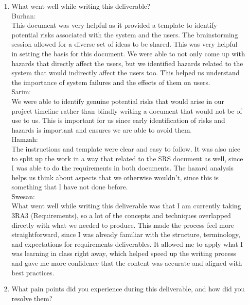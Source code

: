 \documentclass{article}
\begin{document}


\begin{enumerate}
    \item What went well while writing this deliverable? \\
    
    Burhan: \\
    This document was very helpful as it provided a template to identify potential risks associated with the system and the users. The brainstorming session allowed for a diverse set of ideas to be shared. This was very helpful in setting the basis for this document. We were able to not only come up with hazards that directly affect the users, but we identified hazards related to the system that would indirectly affect the users too. This helped us understand the importance of system failures and the effects of them on users.  \\

Sarim: \\
We were able to identify genuine potential risks that would arise in our project timeline rather than blindly writing a document that would not be of use to us. This is important for us since early identification of risks and hazards is important and ensures we are able to avoid them. 
\\

Hamzah: \\
The instructions and template were clear and easy to follow. It was also nice to split up the work in a way that related to the SRS document as well, since I was able to do the requirements in both documents. The hazard analysis helps us think about aspects that we otherwise wouldn't, since this is something that I have not done before.  
\\   

Swesan: \\
What went well while writing this deliverable was that I am currently taking 3RA3 (Requirements), so a lot of the concepts and techniques overlapped directly with what we needed to produce. This made the process feel more straightforward, since I was already familiar with the structure, terminology, and expectations for requirements deliverables. It allowed me to apply what I was learning in class right away, which helped speed up the writing process and gave me more confidence that the content was accurate and aligned with best practices. 
\\
    
    \item What pain points did you experience during this deliverable, and how
    did you resolve them?\\


\end{enumerate}
\end{document}
